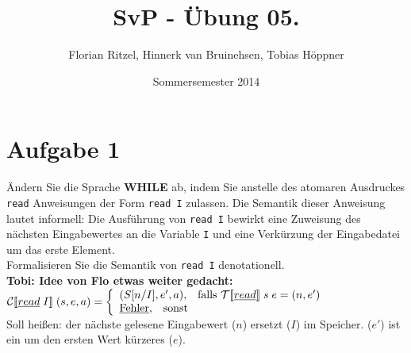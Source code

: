 \documentclass[ngerman,a4paper]{report}
\author{Florian Ritzel, Hinnerk van Bruinehsen, Tobias Höppner}
\title{SvP - Übung 05. }
\date{Sommersemester 2014}
\renewcommand{\maketitle}{}
\begin{document}
\maketitle
\section*{Aufgabe 1}
Ändern Sie die Sprache \textbf{WHILE} ab, indem Sie anstelle des atomaren Ausdruckes \lstinline!read! Anweisungen der Form \lstinline!read I! zulassen. Die Semantik dieser Anweisung lautet informell: Die Ausführung von \lstinline!read I! bewirkt eine Zuweisung des nächsten Eingabewertes an die Variable \lstinline!I! und eine Verkürzung der Eingabedatei um das erste Element.\\
Formalisieren Sie die Semantik von \lstinline!read I! denotationell.\\

%
\textbf{Tobi: Idee von Flo etwas weiter gedacht:}\\
$		\mathcal{C}
[\![\underline{read}\;I]\!]\;(s,e,a) = \left\lbrace\begin{array}{l l} (S[n/I], e', a)\text{,}\quad\text{falls }\mathcal{T}
[\![\underline{read}]\!]\;s\;e = (n, e')\\
		\underline{\text{Fehler}}\text{,}\quad\text{sonst} \end{array}\right.$\\
Soll heißen: der nächste gelesene Eingabewert ($n$) ersetzt ($I$) im Speicher. ($e'$) ist ein um den ersten Wert kürzeres ($e$).\\
\end{document}
